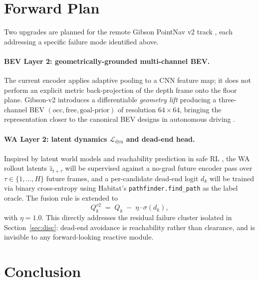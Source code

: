 \documentclass[11pt,a4paper]{article}
\begin{document}
\section{Forward Plan}\label{sec:future}

Two upgrades are planned for the remote Gibson PointNav v2 track
\citep{Gibson2018}, each addressing a specific failure mode identified
above.

\paragraph{BEV Layer 2: geometrically-grounded multi-channel BEV.} The
current encoder applies adaptive pooling to a CNN feature map; it does
not perform an explicit metric back-projection of the depth frame onto
the floor plane. Gibson-v2 introduces a differentiable
\emph{geometry lift} producing a three-channel BEV
$(\text{occ},\text{free},\text{goal-prior})$ of resolution
$64\times 64$, bringing the representation closer to the canonical
BEV designs in autonomous driving
\citep{LSS2020,BEVFusion2023}.

\paragraph{WA Layer 2: latent dynamics $\mathcal{L}_{\text{dyn}}$ and
dead-end head.} Inspired by latent world models
\citep{HaSchmidhuber2018,DreamerV3} and reachability prediction in
safe RL \citep{Bansal2017}, the WA rollout latents
$\hat{z}_{t+\tau}$ will be supervised against a no-grad future
encoder pass over $\tau\in\{1,\dots,H\}$ future frames, and a
per-candidate dead-end logit $d_k$ will be trained via binary
cross-entropy using Habitat's \texttt{pathfinder.find\_path} as the
label oracle. The fusion rule is extended to
\begin{equation}
Q_k^{v2} \;=\; Q_k \;-\; \eta\cdot\sigma(d_k),
\end{equation}
with $\eta{=}1.0$. This directly addresses the residual failure cluster
isolated in Section~\ref{sec:disc}: dead-end avoidance is reachability
rather than clearance, and is invisible to any forward-looking
reactive module.

\section{Conclusion}
\end{document}
